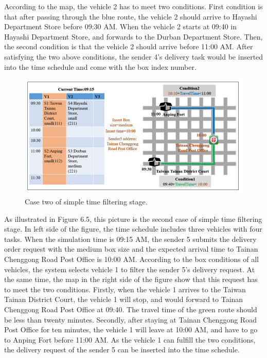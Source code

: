 \documentclass[12pt]{ksthesis}
\begin{document}
\begin{thesis}
{According to the map, the vehicle 2 has to meet two conditions. First condition is that after passing through the blue route, the vehicle 2 should arrive to Hayashi Department Store before 09:30 AM. 
When the vehicle 2 starts at 09:40 in Hayashi Department Store, and forwards to the Durban Department Store. Then, the second condition is that the vehicle 2 should arrive before 11:00 AM.
After satisfying the two above conditions, the sender 4’s delivery task would be inserted into the time schedule and come with the box index number. 

\begin{figure}[t]
\centering
\includegraphics[width=1.0\textwidth]{./Thesis_figures/F6-5_caseTwo_SchedulingStage.PNG}
\caption{\large Case two of simple time filtering stage.}
\vspace{0.5cm}
\label{Fig:CaseTwo_TimeFiltering}
\end{figure}

As illustrated in Figure 6.5, this picture is the second case of simple time filtering stage. In left side of the figure, the time schedule includes three vehicles with four tasks. When the simulation time is 09:15 AM, the sender 5 submits the delivery order request with the medium box size and the expected arrival time to Tainan Chenggong Road Post Office is 10:00 AM.
According to the box conditions of all vehicles, the system selects vehicle 1 to filter the sender 5’s delivery request. At the same time, the map in the right side of the figure show that this request has to meet the two conditions. Firstly, when the vehicle 1 arrives to the Taiwan Tainan District Court, the vehicle 1 will stop, and would forward to Tainan Chenggong Road Post Office at 09:40. The travel time of the green route should be less than twenty minutes. Secondly, after staying at Tainan Chenggong Road Post Office for ten minutes, the vehicle 1 will leave at 10:00 AM, and have to go to Anping Fort before 11:00 AM. 
As the vehicle 1 can fulfill the two conditions, the delivery request of the sender 5 can be inserted into the time schedule.




}
\end{thesis}
\end{document}

